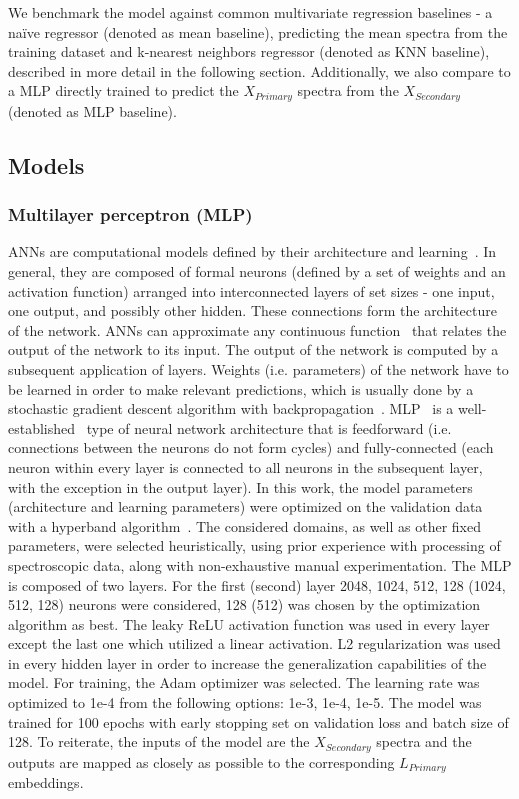 \documentclass[preprint,11pt]{elsarticle}
\begin{document}
We benchmark the model against common multivariate regression baselines - a na\"ive regressor (denoted as mean baseline), predicting the mean spectra from the training dataset and k-nearest neighbors regressor (denoted as KNN baseline), described in more detail in the following section. Additionally, we also compare to a MLP directly trained to predict the $X_{Primary}$ spectra from the $X_{Secondary}$ (denoted as MLP baseline). 




\subsection{Models}
\label{sec:Model}



\subsubsection{Multilayer perceptron (MLP)}
\label{sec:mlp}
\noindent
ANNs are computational models defined by their architecture and learning~\cite{lecun2015deep}. In general, they are composed of formal neurons (defined by a set of weights and an activation function) arranged into interconnected layers of set sizes - one input, one output, and possibly other hidden. These connections form the architecture of the network. ANNs can approximate any continuous function~\cite{cybenko1989approximation} that relates the output of the network to its input. The output of the network is computed by a subsequent application of layers. Weights (i.e. parameters) of the network have to be learned in order to make relevant predictions, which is usually done by a stochastic gradient descent algorithm with backpropagation~\cite{lecun1988theoretical}.
MLP~\cite{rumelhart1985learning} is a well-established~\cite{gardner1998artificial, kotsiopoulos2021machine} type of neural network architecture that is feedforward (i.e. connections between the neurons do not form cycles) and fully-connected (each neuron within every layer is connected to all neurons in the subsequent layer, with the exception in the output layer).
In this work, the model parameters (architecture and learning parameters) were optimized on the validation data with a hyperband algorithm~\cite{omalley2019kerastuner}. The considered domains, as well as other fixed parameters, were selected heuristically, using prior experience with processing of spectroscopic data, along with non-exhaustive manual experimentation. The MLP is composed of two layers. For the first (second) layer 2048, 1024, 512, 128 (1024, 512, 128) neurons were considered, 128 (512) was chosen by the optimization algorithm as best. The leaky ReLU activation function was used in every layer except the last one which utilized a linear activation. L2 regularization was used in every hidden layer in order to increase the generalization capabilities of the model. For training, the Adam optimizer was selected. The learning rate was optimized to 1e-4 from the following options: 1e-3, 1e-4, 1e-5. The model was trained for 100 epochs with early stopping set on validation loss and batch size of 128. To reiterate, the inputs of the model are the $X_{Secondary}$ spectra and the outputs are mapped as closely as possible to the corresponding $L_{Primary}$ embeddings.
\end{document}
